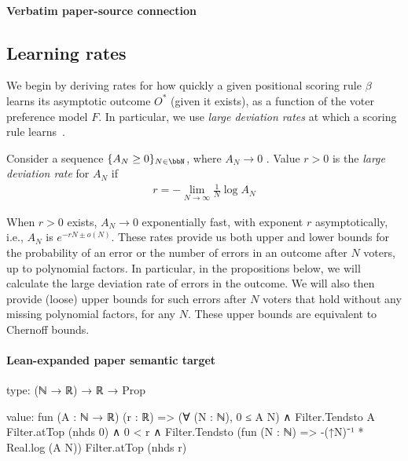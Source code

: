 \documentclass[10pt]{article}
\begin{document}
\paragraph{Verbatim paper-source connection}
\begin{ReviewVerbatim}
\subsection{Learning rates}

We begin by deriving rates for how quickly a given positional scoring rule $\beta$ learns its asymptotic outcome $O^*$ (given it exists), as a function of the voter preference model $F$. %
In particular, we use \textit{large deviation rates} at which a scoring rule learns~\cite{dembo_large_2010}.
\begin{definition}
	Consider a sequence $\{A_N \geq 0\}_{N \in \bbN}$, where $A_N \to 0$ . Value $r>0$ is the \textit{large deviation rate} for $A_N$ if
	\begin{align*}
	r = -\lim_{N\to\infty}\frac{1}{N} \log A_N
	\end{align*}
\end{definition} When $r>0$ exists, $A_N \to 0$ exponentially fast, with exponent $r$ asymptotically, i.e., $A_N$ is $e^{-rN \pm o(N)}$. These rates provide us both upper and lower bounds for the probability of an error or the number of errors in an outcome after $N$ voters, up to polynomial factors. In particular, in the propositions below, we will calculate the large deviation rate of errors in the outcome. We will also then provide (loose) upper bounds for such errors after $N$ voters that hold without any missing polynomial factors, for any $N$. These upper bounds are equivalent to Chernoff bounds.
\end{ReviewVerbatim}



\paragraph{Lean-expanded paper semantic target}
\begin{ReviewVerbatim}
type:
(ℕ → ℝ) → ℝ → Prop

value:
fun (A : ℕ → ℝ) (r : ℝ) =>
  (∀ (N : ℕ), 0 ≤ A N) ∧
    Filter.Tendsto A Filter.atTop (nhds 0) ∧
      0 < r ∧ Filter.Tendsto (fun (N : ℕ) => -(↑N)⁻¹ * Real.log (A N)) Filter.atTop (nhds r)
\end{ReviewVerbatim}
\end{document}
